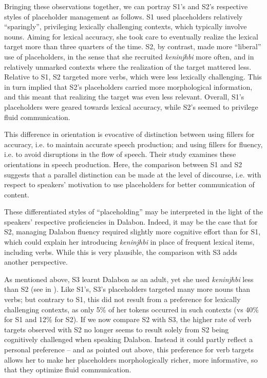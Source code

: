 \documentclass[output=paper]{langscibook}
\begin{document}
Bringing these observations together, we can portray S1’s and S2’s respective styles of placeholder management as follows. S1 used placeholders relatively “sparingly”, privileging lexically challenging contexts, which typically involve nouns. Aiming for lexical accuracy, she took care to eventually realize the lexical target more than three quarters of the time. S2, by contrast, made more “liberal” use of placeholders, in the sense that she recruited \textit{keninjhbi} more often, and in relatively unmarked contexts where the realization of the target mattered less. Relative to S1, S2 targeted more verbs, which were less lexically challenging. This in turn implied that S2’s placeholders carried more morphological information, and this meant that realizing the target was even less relevant. Overall, S1’s placeholders were geared towards lexical accuracy, while S2’s seemed to privilege fluid communication. 

This difference in orientation is evocative of  distinction between using fillers for accuracy, i.e. to maintain accurate speech production; and using fillers for fluency, i.e. to avoid disruptions in the flow of speech. Their study examines these orientations in speech production. Here, the comparison between S1 and S2 suggests that a parallel distinction can be made at the level of discourse, i.e. with respect to speakers’ motivation to use placeholders for better communication of content. 

These differentiated styles of “placeholding” may be interpreted in the light of the speakers’ respective proficiencies in Dalabon. Indeed, it may be the case that for S2, managing Dalabon fluency required slightly more cognitive effort than for S1, which could explain her introducing \textit{keninjhbi} in place of frequent lexical items, including verbs. While this is very plausible, the comparison with S3 adds another perspective. 

As mentioned above, S3 learnt Dalabon as an adult, yet she used \textit{keninjhbi} less than S2 (see  in ). Like S1’s, S3’s placeholders targeted many more nouns than verbs; but contrary to S1, this did not result from a preference for lexically challenging contexts, as only 5\% of her tokens occurred in such contexts (vs 40\% for S1 and 12\% for S2). If we now compare S2 with S3, the higher rate of verb targets observed with S2 no longer seems to result solely from S2 being cognitively challenged when speaking Dalabon. Instead it could partly reflect a personal preference – and as pointed out above, this preference for verb targets allows her to make her placeholders morphologically richer, more informative, so that they optimize fluid communication. 
\end{document}
